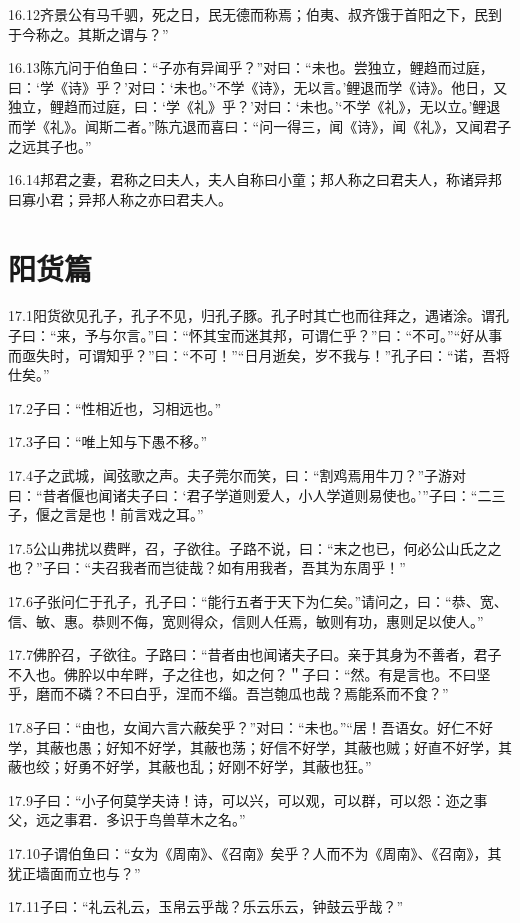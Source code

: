 \documentclass[a4paper,12pt,UTF8,twoside]{ctexbook}
\begin{document}
16.12齐景公有马千驷，死之日，民无德而称焉；伯夷、叔齐饿于首阳之下，民到于今称之。其斯之谓与？”

16.13陈亢问于伯鱼曰：“子亦有异闻乎？”对曰：“未也。尝独立，鲤趋而过庭，曰：‘学《诗》乎？’对曰：‘未也。’‘不学《诗》，无以言。’鲤退而学《诗》。他日，又独立，鲤趋而过庭，曰：‘学《礼》乎？’对曰：‘未也。’‘不学《礼》，无以立。’鲤退而学《礼》。闻斯二者。”陈亢退而喜曰：“问一得三，闻《诗》，闻《礼》，又闻君子之远其子也。”

16.14邦君之妻，君称之曰夫人，夫人自称曰小童；邦人称之曰君夫人，称诸异邦曰寡小君；异邦人称之亦曰君夫人。

\chapter{阳货篇}
17.1阳货欲见孔子，孔子不见，归孔子豚。孔子时其亡也而往拜之，遇诸涂。谓孔子曰：“来，予与尔言。”曰：“怀其宝而迷其邦，可谓仁乎？”曰：“不可。”“好从事而亟失时，可谓知乎？”曰：“不可！”“日月逝矣，岁不我与！”孔子曰：“诺，吾将仕矣。”

17.2子曰：“性相近也，习相远也。”

17.3子曰：“唯上知与下愚不移。”

17.4子之武城，闻弦歌之声。夫子莞尔而笑，曰：“割鸡焉用牛刀？”子游对曰：“昔者偃也闻诸夫子曰：‘君子学道则爱人，小人学道则易使也。’”子曰：“二三
子，偃之言是也！前言戏之耳。”

17.5公山弗扰以费畔，召，子欲往。子路不说，曰：“末之也已，何必公山氏之之也？”子曰：“夫召我者而岂徒哉？如有用我者，吾其为东周乎！”

17.6子张问仁于孔子，孔子曰：“能行五者于天下为仁矣。”请问之，曰：“恭、宽、信、敏、惠。恭则不侮，宽则得众，信则人任焉，敏则有功，惠则足以使人。”

17.7佛肸召，子欲往。子路曰：“昔者由也闻诸夫子曰。亲于其身为不善者，君子不入也。佛肸以中牟畔，子之往也，如之何？＂子曰：“然。有是言也。不曰坚乎，磨而不磷？不曰白乎，涅而不缁。吾岂匏瓜也哉？焉能系而不食？”

17.8子曰：“由也，女闻六言六蔽矣乎？”对曰：“未也。”“居！吾语女。好仁不好学，其蔽也愚；好知不好学，其蔽也荡；好信不好学，其蔽也贼；好直不好学，其蔽也绞；好勇不好学，其蔽也乱；好刚不好学，其蔽也狂。”

17.9子曰：“小子何莫学夫诗！诗，可以兴，可以观，可以群，可以怨：迩之事父，远之事君．多识于鸟兽草木之名。”

17.10子谓伯鱼曰：“女为《周南》、《召南》矣乎？人而不为《周南》、《召南》，其犹正墙面而立也与？”

17.11子曰：“礼云礼云，玉帛云乎哉？乐云乐云，钟鼓云乎哉？”
\end{document}
